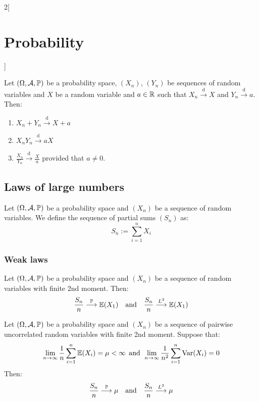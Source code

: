 \documentclass[../../../main.tex]{subfiles}
\begin{document}
\begin{multicols}{2}[\section{Probability}]
\begin{corollary}
\begin{enumerate}
    \end{enumerate}
  \end{corollary}
  \begin{theorem}
    Let $(\Omega,\mathcal{A},\mathbb{P})$ be a probability space, $(X_n)$, $(Y_n)$ be sequences of random variables and $X$ be a random variable and $a\in\mathbb{R}$ such that $X_n\overset{\text{d}}{\longrightarrow} X$ and $Y_n\overset{\text{d}}{\longrightarrow} a$. Then:
    \begin{enumerate}
      \item $X_n+Y_n\overset{\text{d}}{\longrightarrow} X+ a$
      \item $X_nY_n\overset{\text{d}}{\longrightarrow} aX$
      \item $\frac{X_n}{Y_n}\overset{\text{d}}{\longrightarrow} \frac{X}{a}$ provided that $a\ne 0$.
    \end{enumerate}
  \end{theorem}
  \subsection{Laws of large numbers}
  \begin{definition}
    Let $(\Omega,\mathcal{A},\mathbb{P})$ be a probability space and $(X_n)$ be a sequence of random variables. We define the sequence of partial sums $(S_n)$ as: $$S_n:=\sum_{i=1}^nX_i$$
  \end{definition}
  \subsubsection{Weak laws}
  \begin{theorem}
    Let $(\Omega,\mathcal{A},\mathbb{P})$ be a probability space and $(X_n)$ be a sequence of \iid random variables with finite 2nd moment. Then: $$\frac{S_n}{n}\overset{\mathbb{P}}{\longrightarrow}\mathbb{E}(X_1)\quad\text{and}\quad\frac{S_n}{n}\overset{L^2}{\longrightarrow}\mathbb{E}(X_1)$$
  \end{theorem}
  \begin{theorem}
    Let $(\Omega,\mathcal{A},\mathbb{P})$ be a probability space and $(X_n)$ be a sequence of pairwise uncorrelated random variables with finite 2nd moment. Suppose that: $$\lim_{n\to\infty}\frac{1}{n}\sum_{i=1}^n\mathbb{E}(X_i)=\mu<\infty\;\,\text{and}\;\,\lim_{n\to\infty}\frac{1}{n^2}\sum_{i=1}^n\operatorname{Var}(X_i)=0$$ Then: $$\frac{S_n}{n}\overset{\mathbb{P}}{\longrightarrow}\mu\quad\text{and}\quad\frac{S_n}{n}\overset{L^2}{\longrightarrow}\mu$$
  \end{theorem}

\end{multicols}
\end{document}
